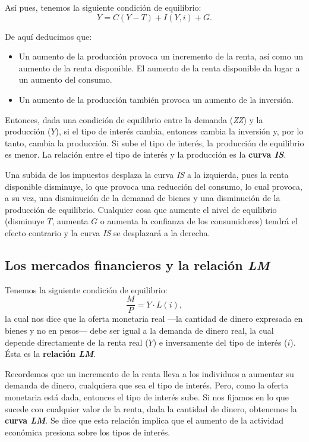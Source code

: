 \documentclass[10pt]{article}
\begin{document}
\begin{multicols*}{2}
Así pues, tenemos la siguiente condición de equilibrio:
\[ Y = C(Y-T) + I(Y,i) + G. \]

De aquí deducimos que:
\begin{itemize}
    \item Un aumento de la producción provoca un incremento de la renta, así como un aumento de la renta disponible. El aumento de la renta disponible da lugar a un aumento del consumo.
    \item Un aumento de la producción también provoca un aumento de la inversión.
\end{itemize}

Entonces, dada una condición de equilibrio entre la demanda (\textit{ZZ}) y la producción ($Y$), si el tipo de interés cambia, entonces cambia la inversión y, por lo tanto, cambia la producción. Si sube el tipo de interés, la producción de equilibrio es menor. La relación entre el tipo de interés y la producción es la \textbf{curva \textit{IS}}.

Una subida de los impuestos desplaza la curva \textit{IS} a la izquierda, pues la renta disponible disminuye, lo que provoca una reducción del consumo, lo cual provoca, a su vez, una disminución de la demanad de bienes y una disminución de la producción de equilibrio. Cualquier cosa que aumente el nivel de equilibrio (disminuye $T$, aumenta $G$ o aumenta la confianza de los consumidores) tendrá el efecto contrario y la curva \textit{IS} se desplazará a la derecha.

\subsection{Los mercados financieros y la relación \textit{LM}}
Tenemos la siguiente condición de equilibrio:
\[ \frac{M}{P} = Y \cdot L(i), \]
la cual nos dice que la oferta monetaria real ---la cantidad de dinero expresada en bienes y no en pesos--- debe ser igual a la demanda de dinero real, la cual depende directamente de la renta real ($Y$) e inversamente del tipo de interés ($i$). Ésta es la \textbf{relación \textit{LM}}.

Recordemos que un incremento de la renta lleva a los individuos a aumentar su demanda de dinero, cualquiera que sea el tipo de interés. Pero, como la oferta monetaria está dada, entonces el tipo de interés sube. Si nos fijamos en lo que sucede con cualquier valor de la renta, dada la cantidad de dinero, obtenemos la \textbf{curva \textit{LM}}. Se dice que esta relación implica que el aumento de la actividad económica presiona sobre los tipos de interés.


\end{multicols*}
\end{document}
